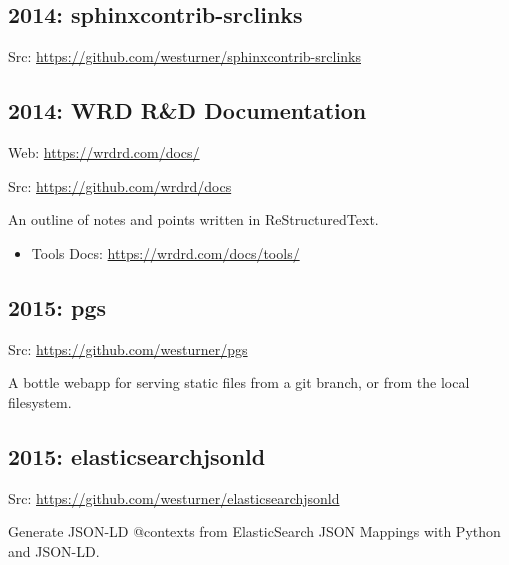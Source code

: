 \documentclass[letter,,openany,oneside]{sphinxhowto}
\begin{document}
\subsection{2014: sphinxcontrib-srclinks}
\label{resume:sphinxcontrib-srclinks}
\begin{DUlineblock}{0em}
\item[] Src: \url{https://github.com/westurner/sphinxcontrib-srclinks}
\end{DUlineblock}


\subsection{2014: WRD R\&D Documentation}
\label{resume:wrd-r-d-documentation}
\begin{DUlineblock}{0em}
\item[] Web: \url{https://wrdrd.com/docs/}
\item[] Src: \url{https://github.com/wrdrd/docs}
\end{DUlineblock}

An outline of notes and points
written in ReStructuredText.
\begin{itemize}
\item {} 
Tools Docs:
\url{https://wrdrd.com/docs/tools/}

\end{itemize}


\subsection{2015: pgs}
\label{resume:pgs}
\begin{DUlineblock}{0em}
\item[] Src: \url{https://github.com/westurner/pgs}
\end{DUlineblock}

A bottle webapp for serving static files from a git branch, or from the local filesystem.


\subsection{2015: elasticsearchjsonld}
\label{resume:elasticsearchjsonld}
\begin{DUlineblock}{0em}
\item[] Src: \url{https://github.com/westurner/elasticsearchjsonld}
\end{DUlineblock}

Generate JSON-LD @contexts from ElasticSearch JSON Mappings
with Python and JSON-LD.
\end{document}
